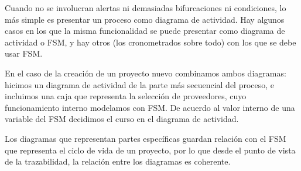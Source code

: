 Cuando no se involucran alertas ni demasiadas bifurcaciones ni condiciones, lo más simple es presentar un proceso como diagrama de actividad. Hay algunos casos en los que la misma funcionalidad se puede presentar como diagrama de actividad o FSM, y hay otros (los cronometrados sobre todo) con los que se debe usar FSM.

En el caso de la creación de un proyecto nuevo combinamos ambos diagramas: hicimos un diagrama de actividad de la parte más secuencial del proceso, e incluimos una caja que representa la selección de proveedores, cuyo funcionamiento interno modelamos con FSM. De acuerdo al valor interno de una variable del FSM decidimos el curso en el diagrama de actividad.

Los diagramas que representan partes específicas guardan relación con el FSM que representa el ciclo de vida de un proyecto, por lo que desde el punto de vista de la trazabilidad, la relación entre los diagramas es coherente.


